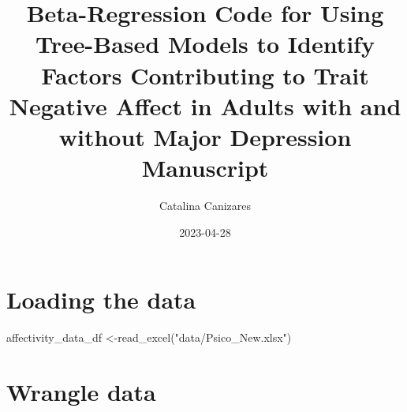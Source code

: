 \documentclass[
  letterpaper,
  DIV=11,
  numbers=noendperiod]{scrartcl}
\title{Beta-Regression Code for Using Tree-Based Models to Identify
Factors Contributing to Trait Negative Affect in Adults with and without
Major Depression Manuscript}
\author{Catalina Canizares}
\date{2023-04-28}
\newenvironment{Shaded}{\begin{snugshade}}{\end{snugshade}}
\newcommand{\FunctionTok}[1]{\textcolor[rgb]{0.28,0.35,0.67}{#1}}
\newcommand{\NormalTok}[1]{\textcolor[rgb]{0.00,0.23,0.31}{#1}}
\newcommand{\OtherTok}[1]{\textcolor[rgb]{0.00,0.23,0.31}{#1}}
\newcommand{\StringTok}[1]{\textcolor[rgb]{0.13,0.47,0.30}{#1}}
\begin{document}
\maketitle


\section{Loading the data}\label{loading-the-data}

\begin{Shaded}
\begin{Highlighting}[]
\NormalTok{affectivity\_data\_df }\OtherTok{\textless{}{-}}\FunctionTok{read\_excel}\NormalTok{(}\StringTok{"data/Psico\_New.xlsx"}\NormalTok{)}
\end{Highlighting}
\end{Shaded}

\section{Wrangle data}\label{wrangle-data}
\end{document}
